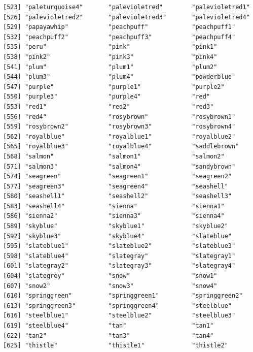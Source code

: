 \documentclass[a4paperpaper,]{article}
\theoremstyle{definition}
\theoremstyle{definition}
\theoremstyle{definition}
\theoremstyle{remark}
\begin{document}
\begin{verbatim}
[523] "paleturquoise4"       "palevioletred"        "palevioletred1"      
[526] "palevioletred2"       "palevioletred3"       "palevioletred4"      
[529] "papayawhip"           "peachpuff"            "peachpuff1"          
[532] "peachpuff2"           "peachpuff3"           "peachpuff4"          
[535] "peru"                 "pink"                 "pink1"               
[538] "pink2"                "pink3"                "pink4"               
[541] "plum"                 "plum1"                "plum2"               
[544] "plum3"                "plum4"                "powderblue"          
[547] "purple"               "purple1"              "purple2"             
[550] "purple3"              "purple4"              "red"                 
[553] "red1"                 "red2"                 "red3"                
[556] "red4"                 "rosybrown"            "rosybrown1"          
[559] "rosybrown2"           "rosybrown3"           "rosybrown4"          
[562] "royalblue"            "royalblue1"           "royalblue2"          
[565] "royalblue3"           "royalblue4"           "saddlebrown"         
[568] "salmon"               "salmon1"              "salmon2"             
[571] "salmon3"              "salmon4"              "sandybrown"          
[574] "seagreen"             "seagreen1"            "seagreen2"           
[577] "seagreen3"            "seagreen4"            "seashell"            
[580] "seashell1"            "seashell2"            "seashell3"           
[583] "seashell4"            "sienna"               "sienna1"             
[586] "sienna2"              "sienna3"              "sienna4"             
[589] "skyblue"              "skyblue1"             "skyblue2"            
[592] "skyblue3"             "skyblue4"             "slateblue"           
[595] "slateblue1"           "slateblue2"           "slateblue3"          
[598] "slateblue4"           "slategray"            "slategray1"          
[601] "slategray2"           "slategray3"           "slategray4"          
[604] "slategrey"            "snow"                 "snow1"               
[607] "snow2"                "snow3"                "snow4"               
[610] "springgreen"          "springgreen1"         "springgreen2"        
[613] "springgreen3"         "springgreen4"         "steelblue"           
[616] "steelblue1"           "steelblue2"           "steelblue3"          
[619] "steelblue4"           "tan"                  "tan1"                
[622] "tan2"                 "tan3"                 "tan4"                
[625] "thistle"              "thistle1"             "thistle2"            

\end{verbatim}
\end{document}
